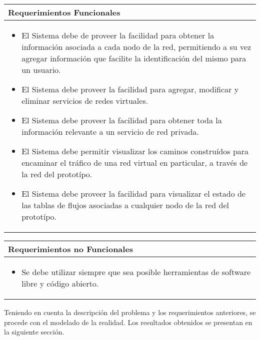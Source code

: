 \clearpage
\begin{table}[Htl]\centering
\begin{tabularx}{\textwidth}{|>{\setlength\hsize{1.0\hsize}\setlength\linewidth{\hsize}}X|}
\hline
Requerimientos Funcionales\\ \hline
\hline
\begin{itemize}
\item El Sistema debe de proveer la facilidad para obtener la informaci\'on asociada a cada nodo de la red, permitiendo a su vez agregar informaci\'on que facilite la identificaci\'on del mismo para un usuario.
\item El Sistema debe proveer la facilidad para agregar, modificar y eliminar servicios de redes virtuales. 
\item El Sistema debe proveer la facilidad para obtener toda la informaci\'on relevante a un servicio de red privada.
\item El Sistema debe permitir visualizar los caminos constru\'idos para encaminar el tr\'afico de una red virtual en particular, a trav\'es de la red del protot\'ipo.
\item El Sistema debe proveer la facilidad para visualizar el estado de las tablas de flujos asociadas a cualquier nodo de la red del protot\'ipo.
\end{itemize}\\
\hline
\end{tabularx}
\end{table}

\begin{table}[Htl]\centering
\begin{tabularx}{\textwidth}{|>{\setlength\hsize{1.0\hsize}\setlength\linewidth{\hsize}}X|}
\hline
Requerimientos no Funcionales\\ \hline
\hline
\begin{itemize}
\item Se debe utilizar siempre que sea posible herramientas de software libre y c\'odigo abierto.
\end{itemize}\\
\hline
\end{tabularx}
\end{table}

Teniendo en cuenta la descripci\'on del problema y los requerimientos anteriores, se procede con el modelado de la realidad. Los resultados obtenidos se presentan en la siguiente secci\'on.

